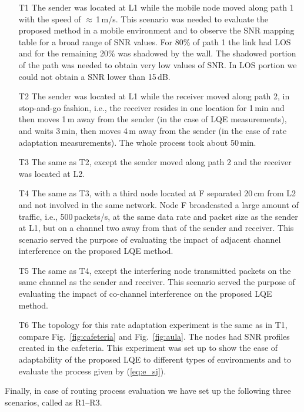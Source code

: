 \documentclass[11pt,draftclsnofoot,journal,onecolumn]{IEEEtran}
\begin{document}
\begin{itemize}
\item[T1]
The sender was located at L1 while the mobile node moved along path 1 with the speed of $\approx$\,1\,m/s. This scenario was needed to evaluate the proposed method in a mobile environment and to observe the SNR mapping table for a broad range of SNR values. For 80\% of path 1 the link had LOS and for the remaining 20\% was shadowed by the wall. The shadowed portion of the path was needed to obtain very low values of SNR. In LOS portion we could not obtain a SNR lower than 15\,dB. 

\item[T2]
The sender was located at L1 while the receiver moved along path 2, in stop-and-go fashion, i.e., the receiver resides in one location for 1\,min and then moves 1\,m away from the sender (in the case of LQE measurements), and waits 3\,min, then moves 4\,m away from the sender (in the case of rate adaptation measurements). The whole process took about 50\,min. 

\item[T3]
The same as T2, except the sender moved along path 2 and the receiver was located at L2.

\item[T4]
The same as T3, with a third node located at F separated 20\,cm from L2 and not involved in the same network. Node F broadcasted a large amount of traffic, i.e., 500\,packets/s, at the same data rate and packet size as the sender at L1, but on a channel two away from that of the sender and receiver. This scenario served the purpose of evaluating the impact of adjacent channel interference on the proposed LQE method.

\item[T5]
The same as T4, except the interfering node transmitted packets on the same channel as the sender and receiver. This scenario served the purpose of evaluating the impact of co-channel interference on the proposed LQE method.

\item[T6]
The topology for this rate adaptation experiment is the same as in T1, compare Fig.~\ref{fig:cafeteria} and Fig.~\ref{fig:aula}. The nodes had SNR profiles created in the cafeteria. This experiment was set up to show the ease of adaptability of the proposed LQE to different types of environments and to evaluate the process given by (\ref{eq:e_sj}).
\end{itemize}

Finally, in case of routing process evaluation we have set up the following three scenarios, called as R1--R3.
\end{document}
